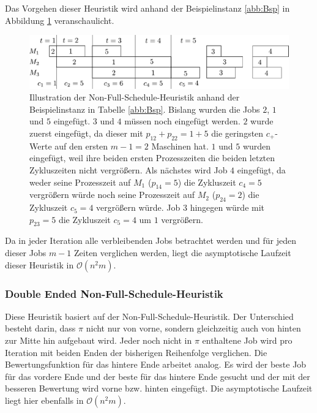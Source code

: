 \documentclass{scrreprt}
\begin{document}
Das Vorgehen dieser Heuristik wird anhand der Beispielinstanz \ref{abb:Bsp} in Abbildung \ref{abb:nfsbsp} veranschaulicht.
\begin{figure}
    \begin{center}
        \includegraphics[width=.8\textwidth]{graphics/nfsbsp.pdf}
    \end{center}
    \caption{
        \label{abb:nfsbsp}
        Illustration der Non-Full-Schedule-Heuristik anhand der Beispielinstanz in Tabelle \ref{abb:Bsp}.
        Bislang wurden die Jobs $2$, $1$ und $5$ eingefügt. $3$ und $4$ müssen noch eingefügt werden.
        $2$ wurde zuerst eingefügt, da dieser mit $p_{12}+p_{22}=1+5$ die geringsten $c_+$-Werte auf den ersten $m-1=2$ Maschinen hat.
        $1$ und $5$ wurden eingefügt, weil ihre beiden ersten Prozesszeiten die beiden letzten Zykluszeiten nicht vergrößern.
        Als nächstes wird Job $4$ eingefügt, da weder seine Prozesszeit auf $M_1$ ($p_{14}=5$) die Zykluszeit $c_4=5$ vergrößern würde
        noch seine Prozesszeit auf $M_2$ ($p_{24}=2$) die Zykluszeit $c_5=4$ vergrößern würde.
        Job $3$ hingegen würde mit $p_{23}=5$ die Zykluszeit $c_5=4$ um $1$ vergrößern.
    }
\end{figure}

Da in jeder Iteration alle verbleibenden Jobs betrachtet werden und für jeden dieser Jobs $m-1$ Zeiten verglichen werden,
liegt die asymptotische Laufzeit dieser Heuristik in $\mathcal{O}(n^2m)$.

\subsubsection{Double Ended Non-Full-Schedule-Heuristik}
Diese Heuristik basiert auf der Non-Full-Schedule-Heuristik.
Der Unterschied besteht darin, dass $\pi$ nicht nur von vorne, sondern gleichzeitig auch von hinten zur Mitte hin aufgebaut wird.
Jeder noch nicht in $\pi$ enthaltene Job wird pro Iteration mit beiden Enden der bisherigen Reihenfolge verglichen.
Die Bewertungsfunktion für das hintere Ende arbeitet analog.
Es wird der beste Job für das vordere Ende und der beste für das hintere Ende gesucht und der mit der besseren Bewertung wird vorne bzw. hinten eingefügt.
Die asymptotische Laufzeit liegt hier ebenfalls in $\mathcal{O}(n^2m)$.
\end{document}
